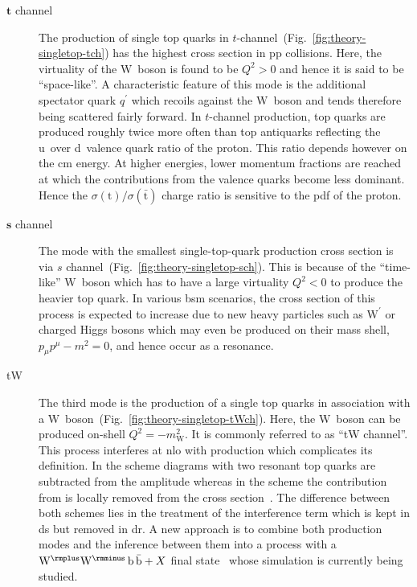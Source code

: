 \begin{description}
\item[$\boldsymbol{t}$ channel] The production of single top quarks in $t$-channel~(Fig.~\ref{fig:theory-singletop-tch}) has the highest cross section in $\mathrm{pp}$ collisions. Here, the virtuality of the $\mathrm{W}$~boson is found to be $Q^2>0$ and hence it is said to be ``space-like''. A characteristic feature of this mode is the additional spectator quark $q^\prime$ which recoils against the $\mathrm{W}$~boson and tends therefore being scattered fairly forward. In $t$-channel production, top quarks are produced roughly twice more often than top antiquarks reflecting the u~over d~valence quark ratio of the proton. This ratio depends however on the \acrlong{cm} energy. At higher energies, lower momentum fractions are reached at which the contributions from the valence quarks become less dominant. Hence the $\sigma(\mathrm{t})/\sigma(\bar{\mathrm{t}})$ charge ratio is sensitive to the \gls{pdf} of the proton.
\item[$\boldsymbol{s}$ channel] The mode with the smallest single-top-quark production cross section is via $s$ channel~(Fig.~\ref{fig:theory-singletop-sch}). This is because of the ``time-like'' $\mathrm{W}$~boson which has to have a large virtuality $Q^2<0$ to produce the heavier top quark. In various \gls{bsm} scenarios, the cross section of this process is expected to increase due to new heavy particles such as $\mathrm{W}^\prime$ or charged Higgs bosons which may even be produced on their mass shell, $p_{\mu}p^{\mu}-m^{2}=0$, and hence occur as a resonance.
\item[tW] The third mode is the production of a single top quarks in association with a $\mathrm{W}$~boson~(Fig.~\ref{fig:theory-singletop-tWch}). Here, the $\mathrm{W}$~boson can be produced on-shell $Q^2=-m_\mathrm{W}^{2}$. It is commonly referred to as ``tW channel''. This process interferes at \gls{nlo} with \ttbar production which complicates its definition. In the  scheme  diagrams with two resonant top quarks are subtracted from the amplitude whereas in the  scheme the contribution from \ttbar is locally removed from the cross section~\cite{Tait:1999cf,1126-6708-2009-11-074}. The difference between both schemes lies in the treatment of the interference term which is kept in \gls{ds} but removed in \gls{dr}. A new approach is to combine both production modes and the inference between them into a process with a $\mathrm{W}^{\rmplus}\mathrm{W}^{\rmminus}\,\mathrm{b}\,\bar{\mathrm{b}}+X$ final state~\cite{Cascioli:2013wga} whose simulation is currently being studied.
\end{description}

